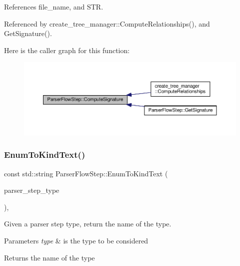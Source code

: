 References file\+\_\+name, and S\+TR.



Referenced by create\+\_\+tree\+\_\+manager\+::\+Compute\+Relationships(), and Get\+Signature().

Here is the caller graph for this function\+:
\nopagebreak
\begin{figure}[H]
\begin{center}
\leavevmode
\includegraphics[width=350pt]{dd/d99/classParserFlowStep_ae74f45035340d133b9bddad49ca18653_icgraph}
\end{center}
\end{figure}
\mbox{\label{classParserFlowStep_aace57969f3a1eb1432ab9f31de6da753}} 
\subsubsection{\texorpdfstring{Enum\+To\+Kind\+Text()}{EnumToKindText()}}
{\footnotesize\ttfamily const std\+::string Parser\+Flow\+Step\+::\+Enum\+To\+Kind\+Text (\begin{DoxyParamCaption}\item[{const \hyperlink{parser__flow__step_8hpp_a8e093a5d7a60426e90f01aa6e6a1aa6a}{Parser\+Flow\+Step\+\_\+\+Type}}]{parser\+\_\+step\+\_\+type }\end{DoxyParamCaption})\hspace{0.3cm}{\ttfamily [static]}, {\ttfamily [protected]}}



Given a parser step type, return the name of the type. 


\begin{DoxyParams}{Parameters}
{\em type} & is the type to be considered \\
\hline
\end{DoxyParams}
\begin{DoxyReturn}{Returns}
the name of the type 
\end{DoxyReturn}


